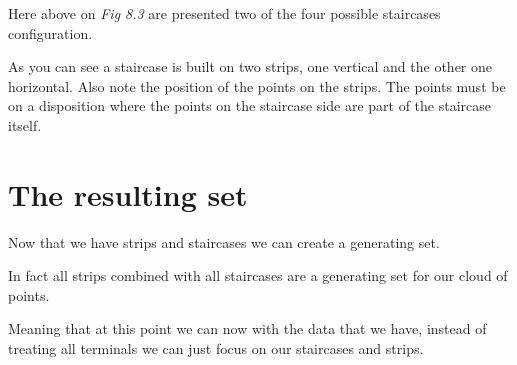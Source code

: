 Here above on \emph{Fig 8.3} are presented two of the four possible staircases configuration.

As you can see a staircase is built on two strips, one vertical and the other one horizontal. Also note the position of the points on the strips. The points must be on a disposition where the points on the staircase side are part of the staircase itself.
\section{The resulting set}%
Now that we have strips and staircases we can create a generating set.

In fact all strips combined with all staircases are a generating set for our cloud of points.

Meaning that at this point we can now with the data that we have, instead of treating all terminals we can just focus on our staircases and strips.

